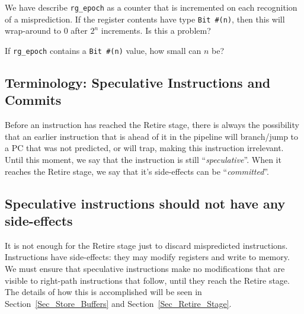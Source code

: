 \hdivider

\Exercise

We have describe \verb|rg_epoch| as a counter that is incremented on
each recognition of a misprediction.  If the register contents have
type \verb|Bit #(n)|, then this will wrap-around to 0 after $2^n$
increments.  Is this a problem?

\Exercise

If \verb|rg_epoch| contains a \verb|Bit #(n)| value, how small can $n$ be?

\Endexercise


\subsection{Terminology: Speculative Instructions and Commits}


Before an instruction has reached the Retire stage, there is always
the possibility that an earlier instruction that is ahead of it in the
pipeline will branch/jump to a PC that was not predicted, or will
trap, making this instruction irrelevant.  Until this moment, we say
that the instruction is still ``\emph{speculative}''.  When it reaches
the Retire stage, we say that it's side-effects can be
``\emph{committed}''.


\subsection{Speculative instructions should not have any side-effects}

It is not enough for the Retire stage just to discard mispredicted
instructions.  Instructions have side-effects: they may modify
registers and write to memory.  We must ensure that speculative
instructions make no modifications that are visible to right-path
instructions that follow, until they reach the Retire stage.  The
details of how this is accomplished will be seen in
Section~\ref{Sec_Store_Buffers} and Section~\ref{Sec_Retire_Stage}.


